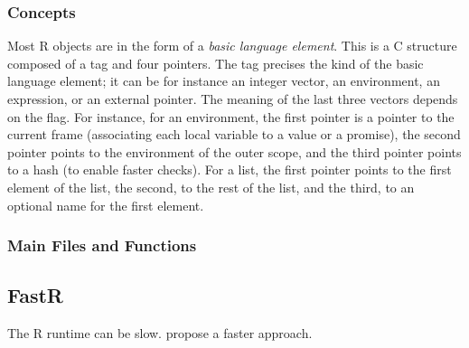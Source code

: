 \documentclass{article}
\newcommand\R{R}
\begin{document}
\subsubsection{Concepts}

Most \R{} objects are in the form of a \emph{basic language element}.
This is a C structure composed of a tag and four pointers.
The tag precises the kind of the basic language element;
it can be for instance an integer vector, an environment, an expression, or an external pointer.
The meaning of the last three vectors depends on the flag.
%
For instance, for an environment, the first pointer is a pointer
to the current frame (associating each local variable to a value or a promise),
the second pointer points to the environment of the outer scope,
and the third pointer points to a hash (to enable faster checks).
%
For a list, the first pointer points to the first element of the list,
the second, to the rest of the list,
and the third, to an optional name for the first element.

\subsubsection{Main Files and Functions}


\subsection{FastR}

The \R{} runtime can be slow.
\cite{kalibera2014fast} propose a faster approach.


\printbibliography
\end{document}
